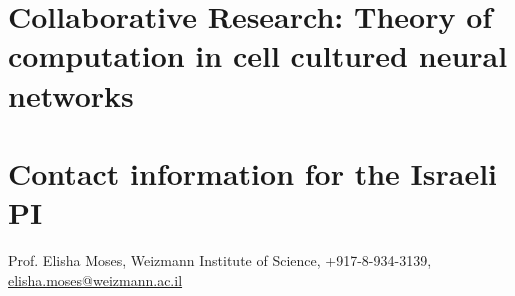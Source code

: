 \section{Collaborative Research: Theory of computation in cell cultured neural networks}
\section{Contact information for the Israeli PI}
\noindent Prof. Elisha Moses, Weizmann Institute of Science, +917-8-934-3139, \href{mailto:elisha.moses@weizmann.ac.il}{elisha.moses@weizmann.ac.il}

